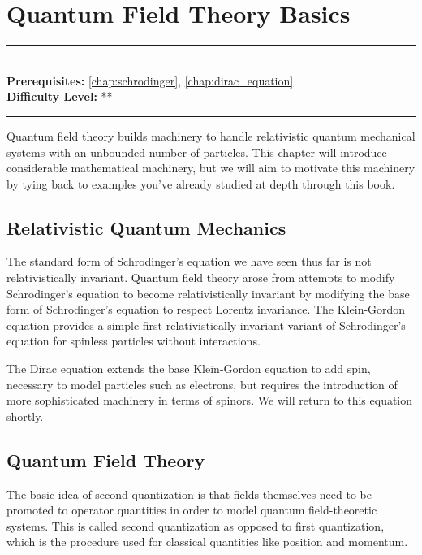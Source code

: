 \documentclass[book.tex]{subfiles}
\begin{document}
\chapter{Quantum Field Theory Basics}

\label{chap:qft_basics}
\noindent\rule{11cm}{0.4pt} \\
\textbf{Prerequisites:} \autoref{chap:schrodinger}, \autoref{chap:dirac_equation} \\
\textbf{Difficulty Level:} ** \\
\noindent\rule{11cm}{0.4pt}
\vspace{5mm}

Quantum field theory builds machinery to handle relativistic quantum mechanical systems with an unbounded number of particles. 
This chapter will introduce considerable mathematical machinery, but we will aim to motivate this machinery by tying back to examples you've already studied at depth through this book.


\section{Relativistic Quantum Mechanics}

The standard form of Schrodinger's equation we have seen thus far is not relativistically invariant. Quantum field theory arose from attempts to modify Schrodinger's equation to become relativistically invariant by modifying the base form of Schrodinger's equation to respect Lorentz invariance. The Klein-Gordon equation provides a simple first relativistically invariant variant of Schrodinger's equation for spinless particles without interactions.

The Dirac equation extends the base Klein-Gordon equation to add spin, necessary to model particles such as electrons, but requires the introduction of more sophisticated machinery in terms of spinors. We will return to this equation shortly.

\section{Quantum Field Theory}

The basic idea of second quantization is that fields themselves need to be promoted to operator quantities in order to model quantum field-theoretic systems. This is called second quantization as opposed to first quantization, which is the procedure used for classical quantities like position and momentum. 
\end{document}
